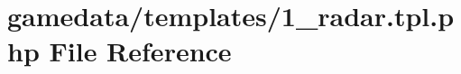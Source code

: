 \hypertarget{1__radar_8tpl_8php}{\section{gamedata/templates/1\+\_\+radar.tpl.\+php File Reference}
\label{1__radar_8tpl_8php}
}
